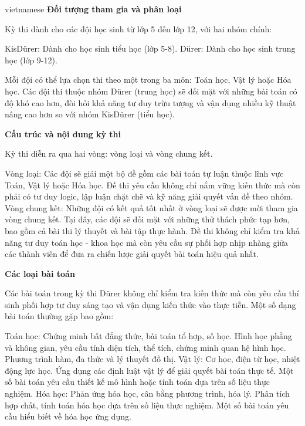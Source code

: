 \documentclass{article}
\begin{document}
\begin{otherlanguage*}{vietnamese}
\textbf{Đối tượng tham gia và phân loại}

Kỳ thi dành cho các đội học sinh từ lớp 5 đến lớp 12, với hai nhóm chính:
\begin{itemize}[topsep=0pt, partopsep=0pt, itemsep=0pt]
    \ii KisDürer: Dành cho học sinh tiểu học (lớp 5-8).
    \ii Dürer: Dành cho học sinh trung học (lớp 9-12).
\end{itemize}

Mỗi đội có thể lựa chọn thi theo một trong ba môn: Toán học, Vật lý hoặc Hóa học. Các đội thi thuộc nhóm Dürer (trung học) sẽ đối mặt với những bài toán có độ khó cao hơn,
đòi hỏi khả năng tư duy trừu tượng và vận dụng nhiều kỹ thuật nâng cao hơn so với nhóm KisDürer (tiểu học).

\textbf{Cấu trúc và nội dung kỳ thi}

Kỳ thi diễn ra qua hai vòng: vòng loại và vòng chung kết.
\begin{enumerate}[topsep=0pt, partopsep=0pt, itemsep=0pt]
    \ii Vòng loại: Các đội sẽ giải một bộ đề gồm các bài toán tự luận thuộc lĩnh vực Toán, Vật lý hoặc Hóa học.
    Đề thi yêu cầu không chỉ nắm vững kiến thức mà còn phải có tư duy logic, lập luận chặt chẽ và kỹ năng giải quyết vấn đề theo nhóm.
    \ii Vòng chung kết: Những đội có kết quả tốt nhất ở vòng loại sẽ được mời tham gia vòng chung kết.
    Tại đây, các đội sẽ đối mặt với những thử thách phức tạp hơn, bao gồm cả bài thi lý thuyết và bài tập thực hành.
    Đề thi không chỉ kiểm tra khả năng tư duy toán học - khoa học mà còn yêu cầu sự phối hợp nhịp nhàng giữa các thành viên để đưa ra chiến lược giải quyết bài toán hiệu quả nhất.
\end{enumerate}
	
\textbf{Các loại bài toán}

Các bài toán trong kỳ thi Dürer không chỉ kiểm tra kiến thức mà còn yêu cầu thí sinh phối hợp tư duy sáng tạo và vận dụng kiến thức vào thực tiễn.
Một số dạng bài toán thường gặp bao gồm:
\begin{itemize}[topsep=0pt, partopsep=0pt, itemsep=0pt]
    \ii Toán học: Chứng minh bất đẳng thức, bài toán tổ hợp, số học. Hình học phẳng và không gian, yêu cầu tính diện tích, thể tích, chứng minh quan hệ hình học.
    Phương trình hàm, đa thức và lý thuyết đồ thị.
    \ii Vật lý: Cơ học, điện từ học, nhiệt động lực học. Ứng dụng các định luật vật lý để giải quyết bài toán thực tế.
    Một số bài toán yêu cầu thiết kế mô hình hoặc tính toán dựa trên số liệu thực nghiệm.
    \ii Hóa học: Phản ứng hóa học, cân bằng phương trình, hóa lý. Phân tích hợp chất, tính toán hóa học dựa trên số liệu thực nghiệm.
    Một số bài toán yêu cầu hiểu biết về hóa học ứng dụng.
\end{itemize}


\end{otherlanguage*}
\end{document}
